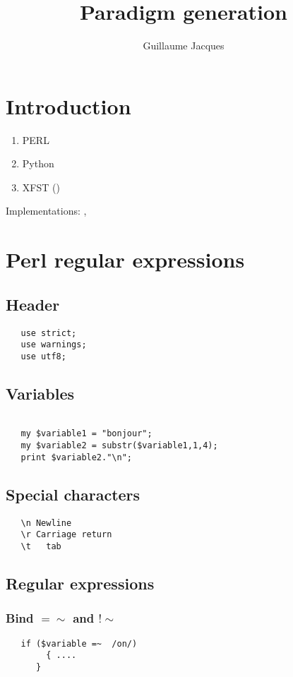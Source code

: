 \documentclass[oldfontcommands,oneside,a4paper,11pt]{article}
\begin{document}
 

\title{Paradigm generation}
\author{Guillaume Jacques}
\maketitle
\section{Introduction}
\begin{enumerate}
\item PERL
\item Python
\item XFST (\citealt{bessley03fsm})
\end{enumerate}

Implementations: \citet{jacques12khaling}, \citet{walther14compactness}



\section{Perl regular expressions}


\subsection{Header}
\begin{verbatim}
   use strict;
   use warnings;
   use utf8;
\end{verbatim}

\subsection{Variables}

\begin{verbatim}

   my $variable1 = "bonjour";
   my $variable2 = substr($variable1,1,4);
   print $variable2."\n";

\end{verbatim}

\subsection{Special characters}
\begin{verbatim}
   \n Newline
   \r Carriage return
   \t	tab 
\end{verbatim}

\subsection{Regular expressions}
\subsubsection{Bind $=\sim$ and  $!\sim$}
\begin{verbatim}
   if ($variable =~  /on/) 
    	{ ....
      }
\end{verbatim}

 




\end{document}
